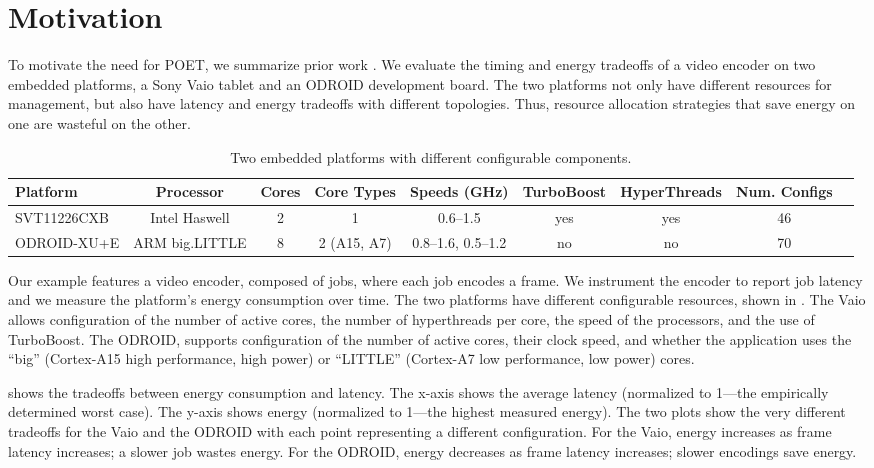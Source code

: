 \section{Motivation}
\label{sec:poet-motivation}

To motivate the need for POET, we summarize prior work \cite{Imes2014}.
We evaluate the timing and energy tradeoffs of a video encoder on two embedded platforms, a Sony Vaio tablet and an ODROID development board.
The two platforms not only have different resources for management, but also have latency and energy tradeoffs with different topologies.
Thus, resource allocation strategies that save energy on one are wasteful on the other.

\begin{table*}[t]
\caption{Two embedded platforms with different configurable components.}
\label{tbl:poet-machines}
\tiny
\centering
\begin{tabular}{lcccccccc}
  \textbf{Platform} & 
  \textbf{Processor} &
  \textbf{Cores} & 
  \textbf{Core Types} &
  \textbf{Speeds (GHz)} &
  \textbf{TurboBoost} &
  \textbf{HyperThreads} & 
  \textbf{Num. Configs} \\
  \hline
  \hline
  SVT11226CXB & Intel Haswell  & 2 & 1             & 0.6--1.5          & yes & yes & 46 \\
  ODROID-XU+E & ARM big.LITTLE & 8 & 2 (A15, A7)   & 0.8--1.6, 0.5--1.2 & no  & no  & 70 \\
  \hline 
  \hline
\end{tabular}
\end{table*}

Our example features a video encoder, composed of jobs, where each job encodes a frame.
We instrument the encoder to report job latency and we measure the platform's energy consumption over time.
The two platforms have different configurable resources, shown in .
The Vaio allows configuration of the number of active cores, the number of hyperthreads per core, the speed of the processors, and the use of TurboBoost.
The ODROID, supports configuration of the number of active cores, their clock speed, and whether the application uses the ``big'' (Cortex-A15 high performance, high power) or ``LITTLE'' (Cortex-A7 low performance, low power) cores.

 shows the tradeoffs between energy consumption and latency.
The x-axis shows the average latency (normalized to 1---the empirically determined worst case).
The y-axis shows energy (normalized to 1---the highest measured energy).
The two plots show the very different tradeoffs for the Vaio and the ODROID with each point representing a different configuration.
For the Vaio, energy increases as frame latency increases; \ie a slower job wastes energy.
For the ODROID, energy decreases as frame latency increases; \ie slower encodings save energy.

